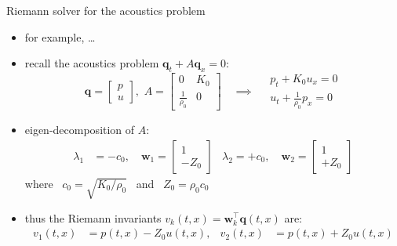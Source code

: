\documentclass[10pt,dvipsnames,usepdftitle=false,
hyperref={pdftitle = {Finite volume methods},
    pdfauthor = {Ed Bueler}}]{beamer}
\newcommand{\bq}{\mathbf{q}}
\newcommand{\bw}{\mathbf{w}}
\begin{document}
\begin{frame}{Riemann solver for the acoustics problem}

\begin{itemize}
\item for example, \dots
\item recall the acoustics problem $\bq_t + A \bq_x = 0$:
        $$\bq = \begin{bmatrix} p \\ u \end{bmatrix}, \,\, A = \begin{bmatrix} 0 & K_0 \\ \frac{1}{\rho_0} & 0 \end{bmatrix} \quad \implies \quad \begin{matrix} p_t + K_0 u_x = 0 \\ u_t + \frac{1}{\rho_0} p_x = 0 \end{matrix}$$
\item eigen-decomposition of $A$:
\begin{align*}
\lambda_1 &= -c_0, \quad \bw_1 = \begin{bmatrix} 1 \\ -Z_0 \end{bmatrix} & \lambda_2 = +c_0, \quad \bw_2 = \begin{bmatrix} 1 \\ +Z_0 \end{bmatrix}
\end{align*}
where \, $c_0 = \sqrt{K_0/\rho_0}$ \, and \, $Z_0=\rho_0 c_0$
\item thus the Riemann invariants $v_k(t,x) = \bw_k^\top \bq(t,x)$ are:
\begin{align*}
v_1(t,x) &= p(t,x) - Z_0 u(t,x), & v_2(t,x) &= p(t,x) + Z_0 u(t,x)
\end{align*}
\end{itemize}
\end{frame}
\end{document}
